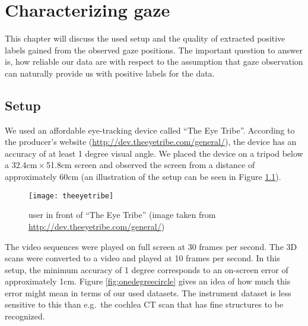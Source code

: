 \chapter{Characterizing gaze}
\label{chap:characterizing-gaze}
This chapter will discuss the used setup and the quality of extracted positive labels gained from the observed gaze positions. The important question to answer is, how reliable our data are with respect to the assumption that gaze observation can naturally provide us with positive labels for the data. 

\section{Setup}
We used an affordable eye-tracking device called ``The Eye Tribe''. 
According to the producer's website (\url{http://dev.theeyetribe.com/general/}), the device has an accuracy of at least 1 degree visual angle. We placed the device on a tripod below a 32.4cm\,$\times$\,51.8cm screen and observed the screen from a distance of approximately 60cm (an illustration of the setup can be seen in Figure \ref{fig:theeyetribe}).

\begin{figure}[ht]
	\centering

	\texttt{[image: theeyetribe]}	
	\caption{user in front of ``The Eye Tribe'' (image taken from \url{http://dev.theeyetribe.com/general/})}
	\label{fig:theeyetribe}
\end{figure}

The video sequences were played on full screen at 30 frames per second. 
The 3D scans were converted to a video and played at 10 frames per second. 
In this setup, the minimum accuracy of 1 degree corresponds to an on-screen error of approximately 1cm. 
Figure \ref{fig:onedegreecircle} gives an idea of how much this error might mean in terms of our used datasets. 
The instrument dataset is less sensitive to this than e.g.\ the cochlea CT scan that has fine structures to be recognized.


